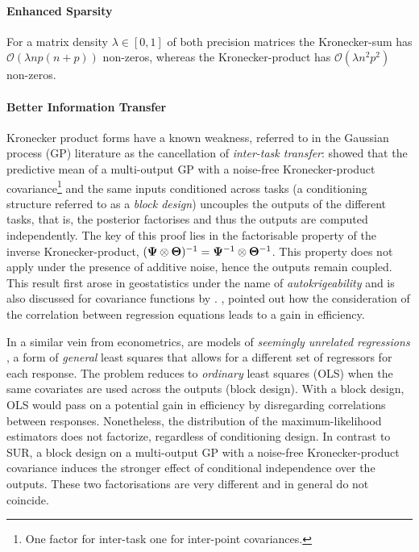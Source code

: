       \paragraph{Enhanced Sparsity}
      For a matrix density $\lambda \in [0,1]$ of both precision matrices the Kronecker-sum has $\mathcal{O}(\lambda n p (n+p))$ non-zeros, whereas the Kronecker-product has $\mathcal{O}(\lambda n^2 p^2)$ non-zeros.

      \paragraph{Better Information Transfer}
      Kronecker product forms have a known weakness, referred to in the Gaussian process (GP) literature as the cancellation of \emph{inter-task transfer}: {\color{black} \citet[\S2.3]{Bonilla:multitask08} showed that the predictive mean of a multi-output GP with a noise-free Kronecker-product covariance\footnote{One factor for inter-task one for inter-point covariances.} and the same inputs conditioned across tasks (a conditioning structure referred to as a \emph{block design}) uncouples the outputs of the different tasks, that is, the posterior factorises and thus the outputs are computed independently.}
      The key of this proof lies in the factorisable property of the inverse Kronecker-product, $(\mathbf{\Psi} \otimes \mathbf{\Theta})^{-1} = \mathbf{\Psi}^{-1} \otimes \mathbf{\Theta}^{-1}$.
      This property does not apply under the presence of additive noise, hence the outputs remain coupled.
      This result first arose in geostatistics under the name of \emph{autokrigeability} \citep{Wackernagel:Geostats03} and is also discussed for covariance functions by \citet{OHagan:MarkovCovMatrices98}.
      \citet{Zellner:Seemingly62}, \citet{Binkley:note88} pointed out how the consideration of the correlation between regression equations leads to a gain in efficiency.

       In a similar vein from econometrics, are models of \emph{seemingly unrelated regressions} \citep[SUR,][]{Zellner:Seemingly62}, a form of \emph{general} least squares that allows for a different set of regressors for each response.
       The problem reduces to \emph{ordinary} least squares (OLS) when the same covariates are used across the outputs (block design).
    With a block design, OLS would pass on a potential gain in efficiency by disregarding correlations between responses.
    Nonetheless, the distribution of the maximum-likelihood estimators does not factorize, regardless of conditioning design.
    In contrast to SUR, a block design on a multi-output GP with a noise-free Kronecker-product covariance induces the stronger effect of conditional independence over the outputs.
    These two factorisations are very different and in general do not coincide.
        
